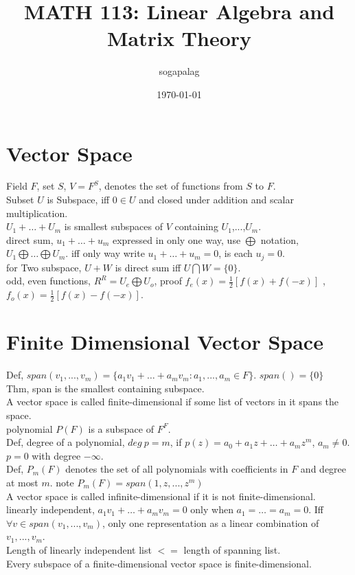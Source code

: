 \documentclass[paper=a4, fontsize=11pt]{scrartcl} %
\title{MATH 113: Linear Algebra and Matrix Theory}
\author{sogapalag}
\date{\normalsize\today}
\numberwithin{equation}{section} %
\numberwithin{figure}{section} %
\numberwithin{table}{section} %
\begin{document}
\maketitle 
\section{Vector Space}
Field $F$, set $S$, $V=F^{S}$, denotes the set of functions from $S$ to $F$.\\
Subset $U$ is Subspace, iff $0\in U$ and closed under addition and scalar multiplication.\\
$U_1 + \dots + U_m$ is smallest subspaces of $V$  containing $U_1$,...,$U_m$.\\
direct sum, $u_1 + \dots + u_m$ expressed in only one way, use $\bigoplus$ notation, $U_1 \bigoplus \dots \bigoplus U_m$. iff only way write $u_1 + \dots + u_m = 0$, is each $u_j = 0$.\\
for Two subspace, $U+W$ is direct sum iff $U\bigcap W = \{0\}$.\\
odd, even functions, $R^R = U_e \bigoplus U_o$, proof $f_e(x) = \frac{1}{2} [f(x) +  f(-x)]$ , $f_o(x) = \frac{1}{2} [f(x) -  f(-x)]$.


\section{Finite Dimensional Vector Space}
Def, $span(v_1,...,v_m) = \{a_1v_1+\dots +a_mv_m: a_1,...,a_m\in F\}$. $span() = \{0\}$\\
Thm, span is the smallest containing subspace.\\
A vector space is called finite-dimensional if some list of vectors in it spans the space.\\
polynomial $P(F)$ is a subspace of $F^F$.\\
Def, degree of a polynomial, $deg\ p = m$, if $p(z)=a_0+a_1z+\dots+ a_mz^m$, $a_m\neq 0$. $p = 0$ with degree $-\infty$.\\
Def, $P_m(F)$ denotes the set of all polynomials with coefficients in $F$ and degree at most $m$. note $P_m(F)=span(1,z,...,z^m)$\\
A vector space is called infinite-dimensional if it is not finite-dimensional.\\
linearly independent, $a_1v_1+\dots+a_mv_m = 0$ only when $a_1=\dots=a_m=0$. Iff $\forall v\in span(v_1,...,v_m)$, only one representation as a linear combination of $v_1,...,v_m$.\\
Length of linearly independent list $<=$ length of spanning list.\\
Every subspace of a finite-dimensional vector space is finite-dimensional.
\end{document}
